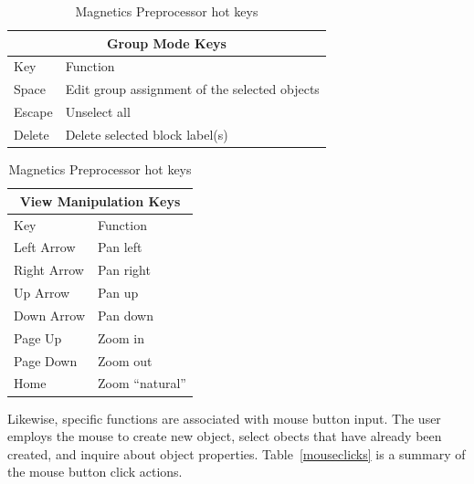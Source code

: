 \documentclass[12pt]{report}
\begin{document}
\begin{table}
\vspace*{12pt}
\begin{tabular}{|l|l|} \hline \hline
\multicolumn{2}{|c|}{Group Mode Keys} \\ \hline \hline
 Key    & Function \\ \hline \hline
 Space  & Edit group assignment of the selected objects \\ \hline
 Escape & Unselect all  \\ \hline
 Delete & Delete selected block label(s) \\ \hline \hline
\end{tabular}

\vspace*{12pt}
\begin{tabular}{|l|l|} \hline \hline
\multicolumn{2}{|c|}{View Manipulation Keys} \\ \hline \hline
 Key    & Function \\ \hline \hline
 Left Arrow  & Pan left \\ \hline
 Right Arrow  & Pan right \\ \hline
 Up Arrow  & Pan up \\ \hline
 Down Arrow  & Pan down \\ \hline
 Page Up & Zoom in  \\ \hline
 Page Down & Zoom out \\ \hline
 Home & Zoom ``natural'' \\ \hline \hline
\end{tabular}
\caption{Magnetics Preprocessor hot keys}
\label{hotkeys}
\end{table}

Likewise, specific functions are associated with mouse button
input.  The user employs the mouse to create new object, select
obects that have already been created, and inquire about object
properties.  Table~\ref{mouseclicks} is a summary of the mouse
button click actions.
\end{document}
